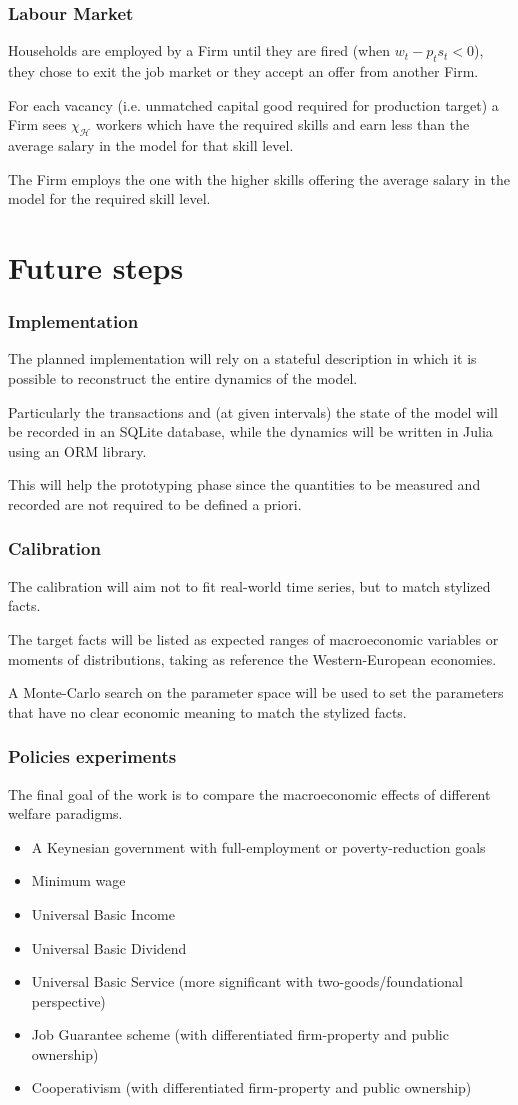 \documentclass[]{beamer}
\begin{document}
\begin{frame}
	\frametitle{Labour Market}
	Households are employed by a Firm until they are fired (when $w_t - p_t s_t < 0$), they chose to exit the job market or they accept an offer from another Firm.

	For each vacancy (i.e. unmatched capital good required for production target) a Firm sees $\chi_\mathcal{H}$ workers which have the required skills and earn less than the average salary in the model for that skill level.

	The Firm employs the one with the higher skills offering the average salary in the model for the required skill level.
\end{frame}

\section{Future steps}
\begin{frame}
	\frametitle{Implementation}
	The planned implementation will rely on a stateful description in which it is possible to reconstruct the entire dynamics of the model.

	Particularly the transactions and (at given intervals) the state of the model will be recorded in an SQLite database, while the dynamics will be written in Julia using an ORM library.

	This will help the prototyping phase since the quantities to be measured and recorded are not required to be defined a priori.
\end{frame}

\begin{frame}
	\frametitle{Calibration}
	The calibration will aim not to fit real-world time series, but to match stylized facts.

	The target facts will be listed as expected ranges of macroeconomic variables or moments of distributions, taking as reference the Western-European economies.

	A Monte-Carlo search on the parameter space will be used to set the parameters that have no clear economic meaning to match the stylized facts.
\end{frame}

\begin{frame}
	\frametitle{Policies experiments}
	The final goal of the work is to compare the macroeconomic effects of different welfare paradigms.
	\begin{itemize}
		\item A Keynesian government with full-employment or poverty-reduction goals
		\item Minimum wage
		\item Universal Basic Income
		\item Universal Basic Dividend
		\item Universal Basic Service (more significant with two-goods/foundational perspective)
		\item Job Guarantee scheme (with differentiated firm-property and public ownership)
		\item Cooperativism (with differentiated firm-property and public ownership)
	\end{itemize}
\end{frame}
\end{document}
